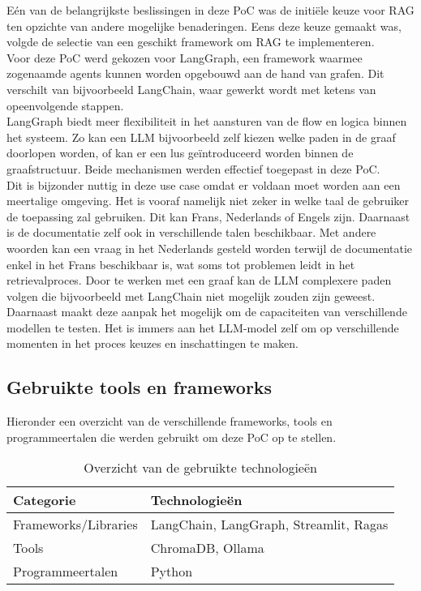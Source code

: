 Eén van de belangrijkste beslissingen in deze PoC was de initiële keuze voor RAG ten opzichte van andere mogelijke benaderingen. Eens deze keuze gemaakt was, volgde de selectie van een geschikt framework om RAG te implementeren.
\\[1em]
Voor deze PoC werd gekozen voor LangGraph, een framework waarmee zogenaamde agents kunnen worden opgebouwd aan de hand van grafen. Dit verschilt van bijvoorbeeld LangChain, waar gewerkt wordt met ketens van opeenvolgende stappen.
\\[1em]
LangGraph biedt meer flexibiliteit in het aansturen van de flow en logica binnen het systeem. Zo kan een LLM bijvoorbeeld zelf kiezen welke paden in de graaf doorlopen worden, of kan er een lus geïntroduceerd worden binnen de graafstructuur. Beide mechanismen werden effectief toegepast in deze PoC.
\\[1em]
Dit is bijzonder nuttig in deze use case omdat er voldaan moet worden aan een meertalige omgeving. Het is vooraf namelijk niet zeker in welke taal de gebruiker de toepassing zal gebruiken. Dit kan Frans, Nederlands of Engels zijn. Daarnaast is de documentatie zelf ook in verschillende talen beschikbaar. Met andere woorden kan een vraag in het Nederlands gesteld worden terwijl de documentatie enkel in het Frans beschikbaar is, wat soms tot problemen leidt in het retrievalproces. Door te werken met een graaf kan de LLM complexere paden volgen die bijvoorbeeld met LangChain niet mogelijk zouden zijn geweest.
\\[1em]
Daarnaast maakt deze aanpak het mogelijk om de capaciteiten van verschillende modellen te testen. Het is immers aan het LLM-model zelf om op verschillende momenten in het proces keuzes en inschattingen te maken.

\subsection{Gebruikte tools en frameworks}
Hieronder een overzicht van de verschillende frameworks, tools en programmeertalen die werden gebruikt om deze PoC op te stellen.

\begin{table}[H]
    \begin{tabular}{|l|l|}
        \hline
        \textbf{Categorie}       & \textbf{Technologieën}               \\ \hline
        Frameworks/Libraries     & LangChain, LangGraph, Streamlit, Ragas \\ \hline
        Tools                   & ChromaDB, Ollama                    \\ \hline
        Programmeertalen        & Python                             \\ \hline
    \end{tabular}
    \caption{Overzicht van de gebruikte technologieën}
\end{table}

